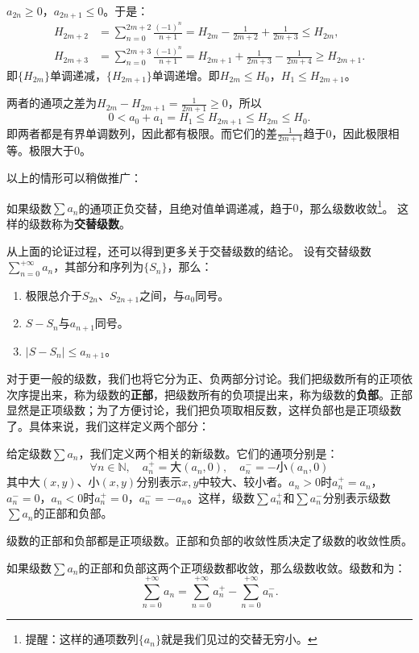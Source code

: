 \documentclass[12pt,UTF8,fontset=none]{ctexbook}
\begin{document}
$a_{2n} \geqslant 0$，$a_{2n+1} \leqslant 0$。于是：
\begin{align*}
    H_{2m+2} &= \sum_{n=0}^{2m+2} \frac{(-1)^{n}}{n+1} = H_{2m} - \frac{1}{2m+2} + \frac{1}{2m+3} \leqslant H_{2m},  \\
    H_{2m+3} &= \sum_{n=0}^{2m+3} \frac{(-1)^{n}}{n+1} = H_{2m+1} + \frac{1}{2m+3} - \frac{1}{2m+4} \geqslant H_{2m+1}. 
\end{align*}
即$\{H_{2m}\}$单调递减，$\{H_{2m+1}\}$单调递增。即$H_{2m} \leqslant H_0 $，$H_1\leqslant H_{2m+1}$。

两者的通项之差为$ H_{2m} - H_{2m+1} = \frac{1}{2m+1} \geqslant 0$，所以
$$ 0 < a_0 + a_1 = H_1 \leqslant H_{2m+1} \leqslant H_{2m} \leqslant H_0. $$
即两者都是有界单调数列，因此都有极限。而它们的差$\frac{1}{2m+1}$趋于$0$，因此极限相等。极限大于$0$。

以上的情形可以稍做推广：
\begin{tm}
    如果级数$\sum a_n$的通项正负交替，且绝对值单调递减，趋于$0$，那么级数收敛\footnote{提醒：这样的通项数列$\{a_n\}$就是我们见过的交替无穷小。}。
    这样的级数称为\textbf{交替级数}。
\end{tm}

从上面的论证过程，还可以得到更多关于交替级数的结论。
设有交替级数$\sum_{n=0}^{+\infty} a_n$，其部分和序列为$\{S_{n}\}$，那么：
\begin{enumerate}
    \item 极限总介于$S_{2n}$、$S_{2n+1}$之间，与$a_0$同号。
    \item $S - S_n$与$a_{n+1}$同号。
    \item $|S - S_n|\leqslant a_{n+1}$。
\end{enumerate}

对于更一般的级数，我们也将它分为正、负两部分讨论。我们把级数所有的正项依次序提出来，称为级数的\textbf{正部}，把级数所有的负项提出来，称为级数的\textbf{负部}。正部显然是正项级数；为了方便讨论，我们把负项取相反数，这样负部也是正项级数了。具体来说，我们这样定义两个部分：
\begin{df}
    给定级数$\sum a_n$，我们定义两个相关的新级数。它们的通项分别是：
    $$ \forall n \in \mathbb{N}, \quad a_n^+ = \text{大}(a_n, 0), \quad a_n^- = -\text{小}(a_n, 0) $$
    其中$\text{大}(x, y)$、$\text{小}(x, y)$分别表示$x,y$中较大、较小者。$a_n>0$时$a_n^+=a_n$，$a_n^-=0$，$a_n<0$时$a_n^+=0$，$a_n^- = -a_n$。这样，级数$\sum a_n^+$和$\sum a_n^-$分别表示级数$\sum a_n$的正部和负部。
\end{df}

级数的正部和负部都是正项级数。正部和负部的收敛性质决定了级数的收敛性质。
\begin{tm}
    如果级数$\sum a_n$的正部和负部这两个正项级数都收敛，那么级数收敛。级数和为：
    $$\sum_{n=0}^{+\infty} a_n = \sum_{n=0}^{+\infty} a_n^+ - \sum_{n=0}^{+\infty} a_n^-.$$    
\end{tm}
\end{document}
